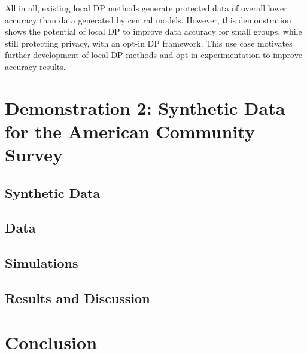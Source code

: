 \documentclass[
]{urban-formatting}
\begin{document}
All in all, existing local DP methods generate protected data of overall
lower accuracy than data generated by central models. However, this
demonstration shows the potential of local DP to improve data accuracy
for small groups, while still protecting privacy, with an opt-in DP
framework. This use case motivates further development of local DP
methods and opt in experimentation to improve accuracy results.~

\section{Demonstration 2: Synthetic Data for the American Community Survey}

\subsection{Synthetic Data}

\subsection{Data}

\subsection{Simulations}

\subsection{Results and Discussion}

\section{Conclusion}











\newpage
\thispagestyle{empty}
\end{document}
